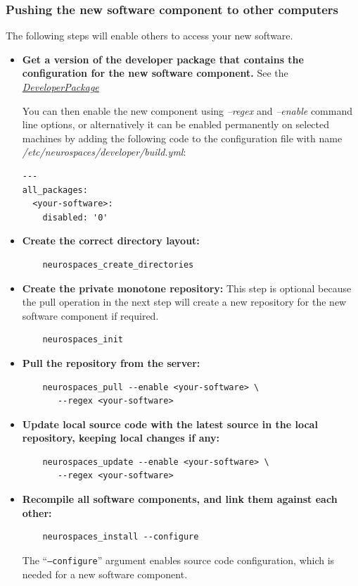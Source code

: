 \documentclass[12pt]{article}
\begin{document}
\subsubsection*{Pushing the new software component to other computers}

The following steps will enable others to access your new software.

\begin{itemize}

\item {\bf Get a version of the developer package that contains the
    configuration for the new software component.}  See
  the~\href{../developer-package/developer-package.tex}{\it
    DeveloperPackage}

  You can then enable the new component using {\it --regex} and {\it
    --enable} command line options, or alternatively it can be enabled
  permanently on selected machines by adding the following code to the
  configuration file with name {\it
    /etc/neurospaces/developer/build.yml}:

\begin{verbatim}
---
all_packages:
  <your-software>:
    disabled: '0'
\end{verbatim}


\item {\bf Create the correct directory layout:}
\begin{verbatim}
	neurospaces_create_directories
\end{verbatim}

\item {\bf Create the private monotone repository:} This step is
  optional because the pull operation in the next step will create a
  new repository for the new software component if required.
\begin{verbatim}
	neurospaces_init
\end{verbatim}

\item {\bf Pull the repository from the server:}
\begin{verbatim}
	neurospaces_pull --enable <your-software> \
	   --regex <your-software>
\end{verbatim}
  
\item {\bf Update local source code with the latest source in the
    local repository, keeping local changes if any:}
\begin{verbatim}
	neurospaces_update --enable <your-software> \
	   --regex <your-software>
\end{verbatim}
  
\item {\bf Recompile all software components, and link them against
    each other:}
\begin{verbatim}
	neurospaces_install --configure
\end{verbatim}
  The ``{\tt --configure}'' argument enables source code
  configuration, which is needed for a new software component.
\end{itemize}
\end{document}
